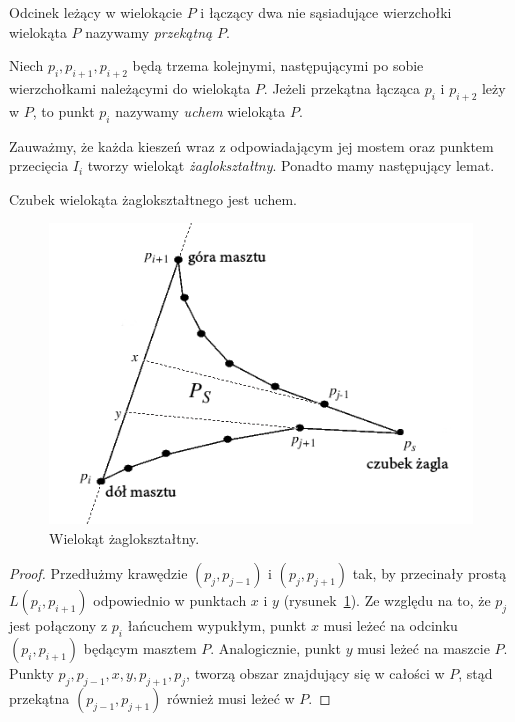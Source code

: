 \begin{definicja}
  Odcinek leżący w wielokącie $P$ i łączący dwa nie sąsiadujące
  wierzchołki wielokąta $P$ nazywamy \emph{przekątną} $P$.
\end{definicja}

\begin{definicja}\label{def:ear}
  Niech $p_i, p_{i+1}, p_{i+2}$ będą trzema kolejnymi, następującymi
  po sobie wierzchołkami należącymi do wielokąta $P$. Jeżeli przekątna
  łącząca $p_{i}$ i $p_{i+2}$ leży w $P$, to punkt $p_i$ nazywamy
  \emph{uchem} wielokąta $P$.
\end{definicja}

Zauważmy, że każda kieszeń wraz z odpowiadającym jej mostem oraz
punktem przecięcia $I_i$ tworzy wielokąt
\emph{żaglokształtny}. Ponadto mamy następujący lemat.

\begin{lemat}\label{lem:sailtip}\emph{\cite{ToussaintInt}}
  Czubek wielokąta żaglokształtnego jest uchem.
\end{lemat}

\begin{figure}[htb]
  \centering
  \includegraphics[scale=0.7]{img/toussaint3}
  \caption{\label{img:toussaint3} Wielokąt żaglokształtny.}
\end{figure}

\begin{proof}
  Przedłużmy krawędzie $(p_j,p_{j-1})$ i $(p_j, p_{j+1})$ tak, by
  przecinały prostą $L(p_i, p_{i+1})$ odpowiednio w punktach $x$ i $y$
  (rysunek~\ref{img:toussaint3}). Ze względu na to, że $p_j$ jest
  połączony z $p_i$ łańcuchem wypukłym, punkt $x$ musi leżeć na
  odcinku $(p_i, p_{i+1})$ będącym masztem $P$. Analogicznie, punkt
  $y$ musi leżeć na maszcie $P$. Punkty $p_j, p_{j-1}, x, y, p_{j+1},
  p_j$, tworzą obszar znajdujący się w całości w $P$, stąd przekątna
  $(p_{j-1}, p_{j+1})$ również musi leżeć w $P$.
\end{proof}

